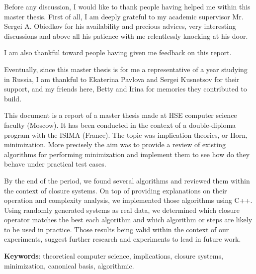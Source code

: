 \documentclass[a4paper, 10pt]{report}
\begin{document}
	

	



Before any discussion, I would like to thank people having helped me within this master thesis. First of all, I am deeply grateful to my academic supervisor Mr. Sergei A. Obiedkov for his availability and precious advices, very interesting discussions and above all his patience with me relentlessly knocking at his door.

I am also thankful toward people having given me feedback on this report.

Eventually, since this master thesis is for me a representative of a year studying in Russia, I am thankful to Ekaterina Pavlova and Sergei Kusnetsov for their support, and my friends here, Betty and Irina for memories they contributed to build.

\newpage
\listoffigures
\newpage

\newpage
\listoftables
\newpage

\newpage
\listofalgorithms
\newpage



This document is a report of a master thesis made at HSE computer science faculty (Moscow). It has been conducted in the context of a double-diploma program with the ISIMA (France). The topic was implication theories, or Horn, minimization. More precisely the aim was to provide a review of existing algorithms for performing minimization and implement them to see how do
they behave under practical test cases.

\vspace{1.2em}

By the end of the period, we found several algorithms and reviewed them within the context of closure systems. On top of providing explanations on their operation and complexity analysis, we implemented those algorithms using C++.
Using randomly generated systems as real data, we determined which closure operator matches the best each algorithm and which algorithm or steps are likely to be used in practice. Those results being valid within the context
of our experiments, suggest further research and experiments to lead in future work.

\vspace{1.2em}

\textbf{Keywords}: theoretical computer science, implications, closure systems, minimization, canonical basis, algorithmic.
\end{document}
